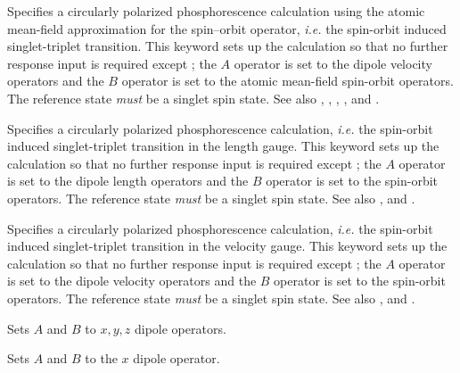 \begin{description}
\item{}
Specifies a circularly polarized phosphorescence 
calculation using the atomic mean-field approximation for the spin--orbit operator, {\it i.e.\/}
the spin-orbit
induced singlet-triplet transition. This keyword sets up the
calculation so that no further response input is required except ; the
$A$ operator is set to the dipole velocity operators and
the $B$ operator is set to the atomic mean-field spin-orbit
operators.
The reference state {\em must} be a singlet spin state. See also , ,
, , and .

\item{}
Specifies a circularly polarized phosphorescence 
calculation, {\it i.e.\/} the spin-orbit
induced singlet-triplet transition in the length gauge.
This keyword sets up the calculation so that no further response input is required except ; 
the $A$ operator is set to the dipole length operators and
the $B$ operator is set to the spin-orbit
operators. \cite{ovhapjhjajthjojcp97,haovbmaqc27}
The reference state {\em must} be a singlet spin state. See also ,  and .

\item{}
Specifies a circularly polarized phosphorescence 
calculation, {\it i.e.\/} the spin-orbit
induced singlet-triplet transition in the velocity gauge. 
This keyword sets up the calculation so that no further response input is required except ; 
the $A$ operator is set to the dipole velocity operators and
the $B$ operator is set to the spin-orbit
operators. \cite{ovhapjhjajthjojcp97,haovbmaqc27}
The reference state {\em must} be a singlet spin state. See also ,  and .

\item{}
Sets $A$ and $B$ to $x, y, z$ dipole operators.

\item{}
Sets $A$ and $B$ to the $x$ dipole operator.


\end{description}
